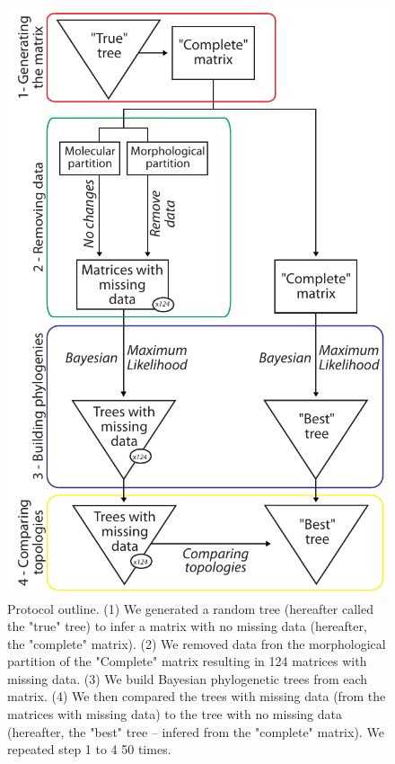 \documentclass[12pt,letterpaper]{article}
\begin{document}
\begin{figure}
\centering
\includegraphics[keepaspectratio=true]{Figures/TEM_Fig_outline.pdf}
\caption{Protocol outline.
(1) We generated a random tree (hereafter called the "true" tree) to infer a matrix with no missing data (hereafter, the "complete" matrix).
(2) We removed data fron the morphological partition of the "Complete" matrix resulting in 124 matrices with missing data.
(3) We build Bayesian phylogenetic trees from each matrix.
(4) We then compared the trees with missing data (from the matrices with missing data) to the tree with no missing data (hereafter, the "best" tree – infered from the "complete" matrix).
We repeated step 1 to 4 50 times.}
\label{Fig_Outline}
\end{figure}
\end{document}
